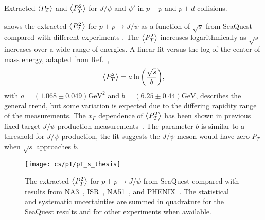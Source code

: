 \documentclass[../main.tex]{subfiles}
\begin{document}
\begin{table}[h!]
	\centering
	\caption{Extracted $\expval{P_T}$ and $\expval{P^2_T}$ for $J/\psi$ and $\psi'$ in $p+p$ and $p+d$ collisions.}
	\label{tab:kaplan_result}
	
\end{table}

 shows the extracted $\expval{P_T^2}$ for $p+p\to J/\psi$ as a function
of $\sqrt{s}$ from SeaQuest compared with different experiments
\cite{badier1983,clark1978,drapier1998,acharya2020}. The $\expval{P_T^2}$
increases logarithmically as $\sqrt{s}$ increases over a wide range of energies.
A linear fit versus the log of the center of mass energy, adapted from Ref.~\cite{acharya2020},
\begin{equation}
	\expval{P_T^2}=a\ln{\left( \frac{\sqrt{s}}{b} \right)},
\end{equation}
with $a=\left(1.068\pm0.049\right)\unit{\GeV\squared}$ and $b=\left(6.25\pm0.44\right)\unit{\GeV}$,
describes the general trend, but some variation is expected due to the differing
rapidity range of the measurements. The $x_F$ dependence of $\expval{P_T^2}$ has been shown in
previous fixed target $J/\psi$ production measurements~\cite{biino1987}.
The parameter $b$ is similar to a threshold for $J/\psi$ production, 
the fit suggests the $J/\psi$ meson would have zero $P_T$ when $\sqrt{s}$ approaches $b$.

\begin{figure}
	\centering
	\texttt{[image: cs/pT/pT\_s\_thesis]}
	\caption{The extracted $\expval{P_T^2}$ for $p+p\rightarrow J/\psi$ from SeaQuest compared
		with results from NA3~\cite{badier1983}, ISR~\cite{clark1978}, NA51~\cite{drapier1998},
		and PHENIX~\cite{acharya2020}. The statistical and systematic uncertainties are summed in quadrature for
		the SeaQuest results and for other experiments when available.   }
	\label{fig:pT_s}
\end{figure}

\FloatBarrier

\ifSubfilesClassLoaded{ \printbibliography[heading=bibintoc,title={References}]}{}
\end{document}
